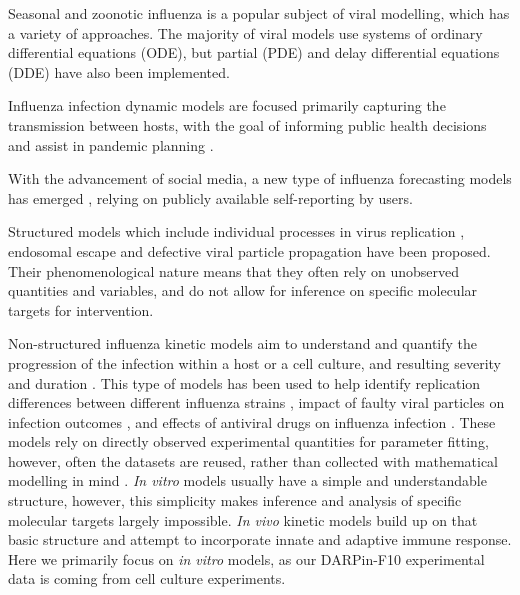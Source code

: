 Seasonal and zoonotic influenza is a popular subject of viral modelling, which has a variety of approaches. The majority of viral models use systems of ordinary differential equations (ODE), but partial (PDE) and delay differential equations (DDE) have also been implemented.

Influenza infection dynamic models are focused primarily capturing the transmission between hosts, with the goal of informing public health decisions and assist in pandemic planning \cite{ferguson2006strategies, mcvernon2007model}.

With the advancement of social media, a new type of influenza forecasting models has emerged \cite{pawelek2014modeling, santillana2015combining, levy2018modeling}, relying on publicly available self-reporting by users.

Structured models which include individual processes in virus replication \cite{sidorenko2004structured}, endosomal escape \cite{lagache2012modeling} and defective viral particle propagation \cite{rudiger2019multiscale} have been proposed. Their phenomenological nature means that they often rely on unobserved quantities and variables, and do not allow for inference on specific molecular targets for intervention.

Non-structured influenza kinetic models aim to understand and quantify the progression of the infection within a host or a cell culture, and resulting severity and duration \cite{beauchemin2008modeling}. This type of models has been used to help identify replication differences between different influenza strains \cite{simon2016avian}, impact of faulty viral particles on infection outcomes \cite{frensing2013continuous}, and effects of antiviral drugs on influenza infection \cite{beauchemin2008modeling, handel2007neuraminidase, holder2011assessing}. These models rely on directly observed experimental quantities for parameter fitting, however, often the datasets are reused, rather than collected with mathematical modelling in mind \cite{boianelli2015modeling}. \textit{In vitro} models usually have a simple and understandable structure, however, this simplicity makes inference and analysis of specific molecular targets largely impossible. \textit{In vivo} kinetic models build up on that basic structure and attempt to incorporate innate \cite{beauchemin2008modeling, handel2010towards,miao2010quantifying} and adaptive \cite{belz2002compromised, handel2010towards, miao2010quantifying} immune response. Here we primarily focus on \textit{in vitro} models, as our DARPin-F10 experimental data is coming from cell culture experiments.

